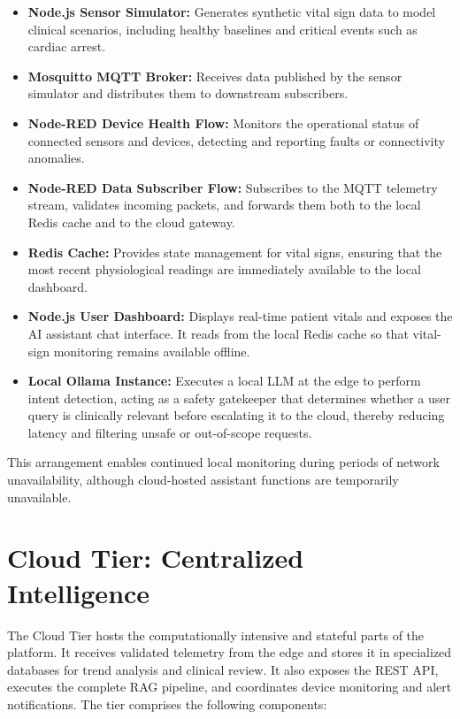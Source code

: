 \documentclass[runningheads]{llncs}
\begin{document}
\begin{itemize}
\item \textbf{Node.js Sensor Simulator:} Generates synthetic vital sign data to model clinical scenarios, including healthy baselines and critical events such as cardiac arrest.
\item \textbf{Mosquitto MQTT Broker:} Receives data published by the sensor simulator and distributes them to downstream subscribers.
\item \textbf{Node-RED Device Health Flow:} Monitors the operational status of connected sensors and devices, detecting and reporting faults or connectivity anomalies.
\item \textbf{Node-RED Data Subscriber Flow:} Subscribes to the MQTT telemetry stream, validates incoming packets, and forwards them both to the local Redis cache and to the cloud gateway.
\item \textbf{Redis Cache:} Provides state management for vital signs, ensuring that the most recent physiological readings are immediately available to the local dashboard.
\item \textbf{Node.js User Dashboard:} Displays real-time patient vitals and exposes the AI assistant chat interface. It reads from the local Redis cache so that vital-sign monitoring remains available offline.
\item \textbf{Local Ollama Instance:} Executes a local LLM at the edge to perform intent detection, acting as a safety gatekeeper that determines whether a user query is clinically relevant before escalating it to the cloud, thereby reducing latency and filtering unsafe or out-of-scope requests.
\end{itemize}

This arrangement enables continued local monitoring during periods of network unavailability, although cloud-hosted assistant functions are temporarily unavailable.

\section{Cloud Tier: Centralized Intelligence}
The Cloud Tier hosts the computationally intensive and stateful parts of the platform. It receives validated telemetry from the edge and stores it in specialized databases for trend analysis and clinical review. It also exposes the REST API, executes the complete RAG pipeline, and coordinates device monitoring and alert notifications. The tier comprises the following components:
\end{document}
